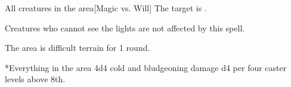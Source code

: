 \begin{spellheader}
    \spelldur{\durshort}
\end{spellheader}
\begin{spelleffects}
    \begin{spelltarget}{All creatures in the area}[Magic vs. Will]
        \spellsuccess The target is \fascinated.
    \end{spelltarget}
\end{spelleffects}
\begin{spellfooter}
    \spellnotes Creatures who cannot see the lights are not affected by this spell.
\end{spellfooter}

\begin{comment}
\subsubsection{I}
\end{comment}

\begin{spellheader}
    \spellrng{\rngmed}
\end{spellheader}
\begin{spelleffects}
    \spelleffect The area is difficult terrain for 1 round.
    \begin{spelltargets}*{Everything in the area}
        \spellsuccess 4d4 cold and bludgeoning damage \add d4 per four caster levels above 8th.
    \end{spelltargets}
\end{spelleffects}
\begin{spellfooter}
    \spellnotes \destructivespellnotes
\end{spellfooter}

